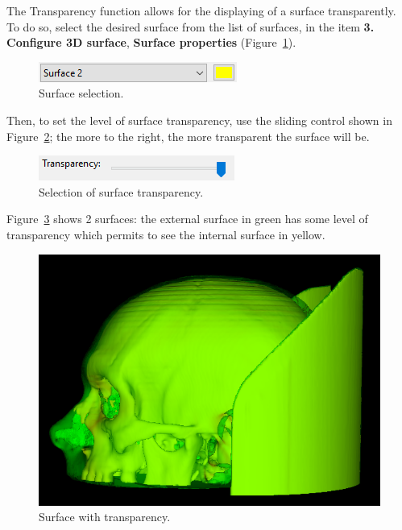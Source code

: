 The Transparency function allows for the displaying of a surface transparently. To do so, select the desired surface from the list of surfaces, in the item \textbf{3. Configure 3D surface}, \textbf{Surface properties} (Figure~\ref{fig:select_surface}).

\begin{figure}[!htb]
\centering
\includegraphics[scale=0.8]{../user_guide_figures/invesalius_screen/surface_select_menu_en.png}
\caption{Surface selection.}
\label{fig:select_surface}
\end{figure}

Then, to set the level of surface transparency, use the sliding control shown in Figure~\ref{fig:select_transparency}; the more to the right, the more transparent the surface will be.

\begin{figure}[!htb]
\centering
\includegraphics[scale=0.7]{../user_guide_figures/invesalius_screen/surface_transparency_en.png}
\caption{Selection of surface transparency.}
\label{fig:select_transparency}
\end{figure}

Figure~\ref{fig:model_transparency} shows 2 surfaces: the external surface in green has some level of transparency which permits to see the internal surface in yellow.

\begin{figure}[!htb]
\centering
\includegraphics[scale=0.3]{../user_guide_figures/invesalius_screen/transparency_2.png}
\caption{Surface with transparency.}
\label{fig:model_transparency}
\end{figure}

